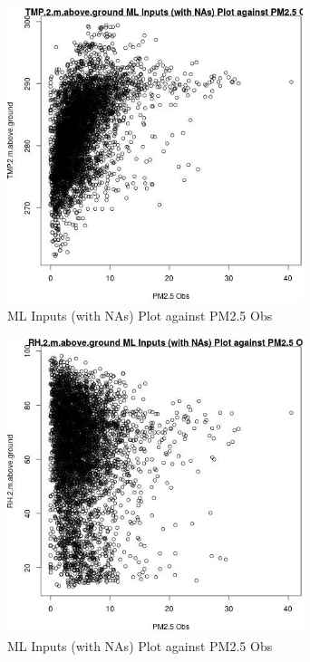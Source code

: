 \begin{figure} 
\centering  
\includegraphics[width=0.77\textwidth]{Code_Outputs/Report_ML_input_PM25_Step4_part_e_de_duplicated_aveswNAs_TMP2mabovegroundvPM25_Obs.jpg} 
\caption{\label{fig:Report_ML_input_PM25_Step4_part_e_de_duplicated_aveswNAsTMP2mabovegroundvPM25_Obs}ML Inputs (with NAs) Plot against PM2.5 Obs} 
\end{figure} 
 

\begin{figure} 
\centering  
\includegraphics[width=0.77\textwidth]{Code_Outputs/Report_ML_input_PM25_Step4_part_e_de_duplicated_aveswNAs_RH2mabovegroundvPM25_Obs.jpg} 
\caption{\label{fig:Report_ML_input_PM25_Step4_part_e_de_duplicated_aveswNAsRH2mabovegroundvPM25_Obs}ML Inputs (with NAs) Plot against PM2.5 Obs} 
\end{figure} 
 

